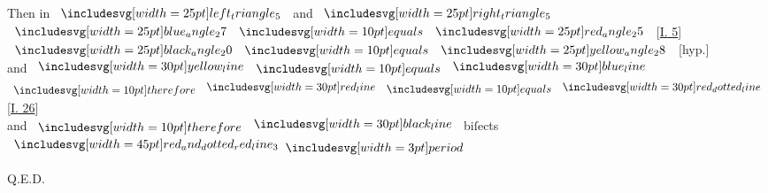 \documentclass[12pt,preview]{standalone}
\begin{document}
\begin{minipage}[t]{0.64\textwidth}
    \hfill

    \begin{center}
        Then in $\img{left_triangle_5}$ and $\img{right_triangle_5}$\\
        $\img{blue_angle_27} \bequals \img{red_angle_25}$ [\hyperref[book1pr5]{\textsc{I.} 5}]\\
        $\img{black_angle_20} \bequals \img{yellow_angle_28}$ [hyp.]\\
        and $\yellowline \bequals \blueline$\\
        $\btherefore \redline \bequals \dottedredline$ [\hyperref[book1pr26]{\textsc{I.} 26}]\\
        and $\btherefore \blackline$ biſects $\bimg{red_and_dotted_red_line_3} \bperiod$
    \end{center}

    \hfill

    \hfill Q.E.D.
\end{minipage}%
\hfill
\begin{minipage}[t]{0.33\textwidth}
    \vspace{40pt}
    
\end{minipage}%
\end{document}

